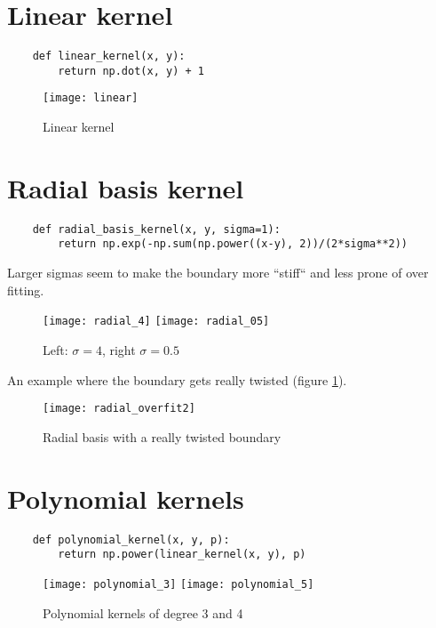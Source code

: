 \documentclass{article}
\begin{document}
\section{Linear kernel}

    \begin{verbatim}
    def linear_kernel(x, y):
        return np.dot(x, y) + 1
    \end{verbatim}

    \begin{figure}[ht]
        \centering
        \texttt{[image: linear]}
        \caption{Linear kernel}
    \end{figure}

\section{Radial basis kernel}

    \begin{verbatim}
    def radial_basis_kernel(x, y, sigma=1):
        return np.exp(-np.sum(np.power((x-y), 2))/(2*sigma**2))
    \end{verbatim}

    Larger sigmas seem to make the boundary more ``stiff`` and less prone of over
    fitting.  
    \begin{figure}[ht]
        \centering
        \texttt{[image: radial\_4]}
        \texttt{[image: radial\_05]}
        \caption{Left: $\sigma = 4$, right $\sigma = 0.5$}
    \end{figure}

    An example where the boundary gets really twisted (figure \ref{fig:radial_overfit}).
    \begin{figure}[ht]
        \centering
        \texttt{[image: radial\_overfit2]}
        \caption{Radial basis with a really twisted boundary}
        \label{fig:radial_overfit}
    \end{figure}

\section{Polynomial kernels}

    \begin{verbatim}
    def polynomial_kernel(x, y, p):
        return np.power(linear_kernel(x, y), p)
    \end{verbatim}

    \begin{figure}[ht]
        \centering
        \texttt{[image: polynomial\_3]}
        \texttt{[image: polynomial\_5]}
        \caption{Polynomial kernels of degree 3 and 4}
    \end{figure}
\end{document}
